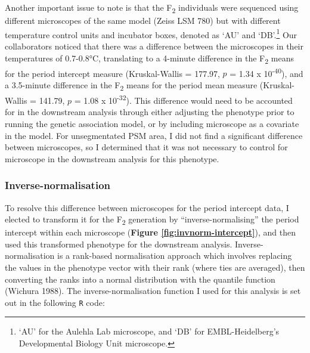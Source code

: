 \documentclass[
]{book}
\newcommand{\passthrough}[1]{#1}
\begin{document}
Another important issue to note is that the F\textsubscript{2} individuals were sequenced using different microscopes of the same model (Zeiss LSM 780) but with different temperature control units and incubator boxes, denoted as `AU' and `DB'.\footnote{`AU' for the Aulehla Lab microscope, and `DB' for EMBL-Heidelberg's Developmental Biology Unit microscope.} Our collaborators noticed that there was a difference between the microscopes in their temperatures of 0.7-0.8°C, translating to a 4-minute difference in the F\textsubscript{2} means for the period intercept measure (Kruskal-Wallis = 177.97, \(p\) = 1.34 x 10\textsuperscript{-40}), and a 3.5-minute difference in the F\textsubscript{2} means for the period mean measure (Kruskal-Wallis = 141.79, \(p\) = 1.08 x 10\textsuperscript{-32}). This difference would need to be accounted for in the downstream analysis through either adjusting the phenotype prior to running the genetic association model, or by including microscope as a covariate in the model. For unsegmentated PSM area, I did not find a significant difference between microscopes, so I determined that it was not necessary to control for microscope in the downstream analysis for this phenotype.

\clearpage

\hypertarget{inverse-norm-sec}{%
\subsubsection{Inverse-normalisation}\label{inverse-norm-sec}}

To resolve this difference between microscopes for the period intercept data, I elected to transform it for the F\textsubscript{2} generation by ``inverse-normalising'' the period intercept within each microscope (\textbf{Figure \ref{fig:invnorm-intercept}}), and then used this transformed phenotype for the downstream analysis. Inverse-normalisation is a rank-based normalisation approach which involves replacing the values in the phenotype vector with their rank (where ties are averaged), then converting the ranks into a normal distribution with the quantile function (Wichura 1988). The inverse-normalisation function I used for this analysis is set out in the following \passthrough{\lstinline!R!} code:
\end{document}
